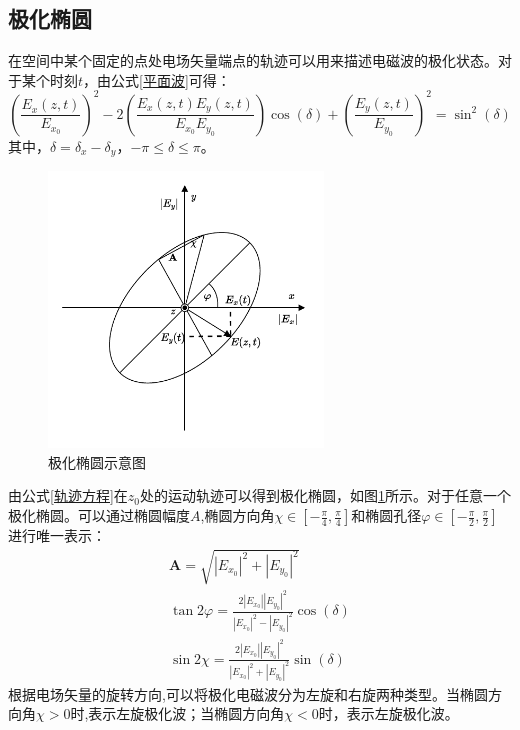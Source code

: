 \subsection{极化椭圆}
在空间中某个固定的点处电场矢量端点的轨迹可以用来描述电磁波的极化状态。对于某个时刻$t$，由公式\eqref{平面波}可得：
\begin{equation}
    \label{轨迹方程}
    \left(\frac{E_x(z, t)}{E_{x_0}}\right)^2-2\left(\frac{E_x(z, t) E_y(z, t)}{E_{x_0} E_{y_0}}\right) \cos (\delta)+\left(\frac{E_y(z, t)}{E_{y_0}}\right)^2=\sin ^2(\delta)
\end{equation}
其中，$\delta=\delta_x-\delta_y$，$-\pi \leqslant \delta \leqslant \pi$。

\begin{figure}[h]
    \includegraphics[width=7.3cm]{pic/chapter2/极化椭圆示意图.pdf}
    \caption{极化椭圆示意图}
    \label{极化椭圆示意图}
\end{figure}

由公式\eqref{轨迹方程}在$z_0$处的运动轨迹可以得到极化椭圆，如图\ref{极化椭圆示意图}所示。对于任意一个极化椭圆。可以通过椭圆幅度$A$,椭圆方向角$\chi \in [-\frac{\pi}{4}, \frac{\pi}{4}]$和椭圆孔径$\varphi \in [-\frac{\pi}{2}, \frac{\pi}{2}]$进行唯一表示：
\begin{gather}
    \mathbf{A}=\sqrt{\left|E_{x_0}\right|^2+\left|E_{y_0}\right|^2}                                                                \\
    \tan 2 \varphi=\frac{2\left|E_{x_0}\right|\left|E_{y_0}\right|^2}{\left|E_{x_0}\right|^2-\left|E_{y_0}\right|^2} \cos (\delta) \\
    \sin 2 \chi=\frac{2\left|E_{x_0}\right|\left|E_{y_0}\right|^2}{\left|E_{x_0}\right|^2+\left|E_{y_0}\right|^2} \sin (\delta)
\end{gather}
根据电场矢量的旋转方向,可以将极化电磁波分为左旋和右旋两种类型。当椭圆方向角$\chi > 0$时,表示左旋极化波；当椭圆方向角$\chi < 0$时，表示左旋极化波。
